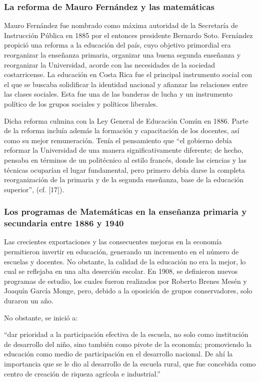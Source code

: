 \subsubsection{La reforma de Mauro Fernández y las matemáticas}

Mauro Fernández fue nombrado como máxima autoridad de la Secretaría de Instrucción Pública en 1885 por el entonces presidente Bernardo Soto. Fernández propició una reforma a la
educación del país, cuyo objetivo primordial era reorganizar la enseñanza primaria, organizar una buena segunda enseñanza y reorganizar la Universidad, acorde con las necesidades de la sociedad costarricense. La educación en Costa Rica fue el principal instrumento social con el que se buscaba solidificar la identidad nacional y afianzar las relaciones entre las clases sociales. Esta fue una de las banderas de lucha y un instrumento político de los grupos sociales y políticos liberales.

Dicha reforma culmina con la Ley General de Educación Común en 1886. Parte de la reforma incluía además la formación y capacitación de los docentes, así como su mejor remuneración. Tenía el pensamiento que “el gobierno debía reformar la Universidad de una manera significativamente diferente; de hecho, pensaba en términos de un politécnico al estilo francés, donde las ciencias y las técnicas ocuparían el lugar fundamental, pero primero debía darse la completa reorganización de la primaria y de la segunda enseñanza, base de la educación superior”, (cf. [17]).

\subsubsection{Los programas de Matemáticas en la enseñanza primaria y secundaria entre 1886 y 1940}

Las crecientes exportaciones y las consecuentes mejoras en la economía permitieron invertir en educación, generando un incremento en el número de escuelas y docentes. No obstante, la calidad de la educación no era la mejor, lo cual se reflejaba en una alta deserción escolar. En 1908, se definieron nuevos programas de estudio, los cuales fueron realizados por Roberto Brenes Mesén y Joaquín García Monge, pero, debido a la oposición de grupos conservadores, solo duraron un año. 

No obstante, se inició a:

        “dar prioridad a la participación efectiva de la escuela, no solo como institución de desarrollo del niño, sino también como pivote de la economía; promoviendo la educación como medio de participación en el desarrollo nacional. De ahí la importancia que se le dio al desarrollo de la escuela rural, que fue concebida como centro de creación de riqueza agrícola e industrial.”

